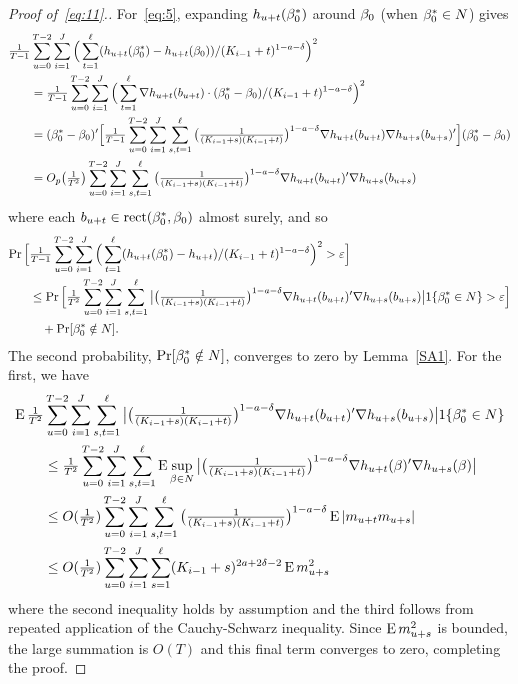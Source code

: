 \documentclass[12pt,fleqn]{article}
\begin{document}
\begin{proof}[Proof of~\eqref{eq:11}.]
For~\eqref{eq:5}, expanding $h_{u+t}(\beta_0^*)$ around $\beta_0$ (when
$\beta_0^* \in N$) gives
\begin{align*}
  \tfrac{1}{T-1} & \sum_{u = 0}^{T-2} \sum_{i=1}^J \Big(\sum_{t = 1}^{\ell} (h_{u + t}(\beta_0^*) - h_{u + t}(\beta_0))/ (K_{i-1} + t)^{1-a-\delta} \Big)^2 \\
  &= \tfrac{1}{T-1} \sum_{u = 0}^{T-2} \sum_{i=1}^J \Big(\sum_{t = 1}^{\ell}
  \nabla h_{u + t}(b_{u+t}) \cdot (\beta_0^* - \beta_0) / (K_{i-1} + t)^{1-a-\delta}\Big)^2 \\
  &= (\beta_0^* - \beta_0)' \Big[\tfrac{1}{T-1} \sum_{u = 0}^{T-2} \sum_{i=1}^J \sum_{s,t = 1}^{\ell}
  \big(\tfrac{1}{(K_{i-1} + s) (K_{i-1} + t)}\big)^{1-a-\delta} \nabla h_{u + t}(b_{u+t}) \nabla h_{u + s}(b_{u+s})' \Big] (\beta_0^* - \beta_0) \\
  &= O_p\big(\tfrac{1}{T^2}\big) \sum_{u = 0}^{T-2} \sum_{i=1}^J \sum_{s,t = 1}^{\ell}
  \big(\tfrac{1}{(K_{i-1} + s) (K_{i-1} + t)}\big)^{1-a-\delta} \nabla h_{u + t}(b_{u+t})' \nabla h_{u + s}(b_{u+s})
\end{align*}
where each $b_{u+t} \in \operatorname{rect}(\beta_0^*,\beta_0)$ almost surely, and so
\begin{align*}
  \operatorname{Pr}\Big[& \tfrac{1}{T-1} \sum_{u = 0}^{T-2} \sum_{i=1}^J
  \Big(\sum_{t = 1}^{\ell} (h_{u + t}(\beta_0^*) - h_{u + t})/ (K_{i-1} + t)^{1-a-\delta}\Big)^2 > \varepsilon \Big] \\
  & \leq \operatorname{Pr}\Big[ \tfrac{1}{T^2} \sum_{u = 0}^{T-2} \sum_{i=1}^J \sum_{s,t = 1}^{\ell}
  \big\lvert \big(\tfrac{1}{(K_{i-1} + s) (K_{i-1} + t)}\big)^{1-a-\delta}
  \nabla h_{u + t}(b_{u+t})' \nabla h_{u + s}(b_{u+s}) \big\rvert 1\{\beta_0^* \in N\} > \varepsilon \Big] \\
  &\quad + \operatorname{Pr}[\beta_0^* \notin N].
\end{align*}
The second probability, $\operatorname{Pr}[\beta_0^* \notin N]$, converges to zero by
Lemma~\ref{SA1}. For the first, we have
\begin{align*}
  \operatorname{E} \tfrac{1}{T^2} &\sum_{u = 0}^{T-2} \sum_{i=1}^J \sum_{s,t = 1}^{\ell}
  \big\lvert \big(\tfrac{1}{(K_{i-1} + s) (K_{i-1} + t)}\big)^{1-a-\delta}
  \nabla h_{u + t}(b_{u+t})' \nabla h_{u + s}(b_{u+s}) \big\rvert 1\{\beta_0^* \in N\} \\
  &\leq \tfrac{1}{T^2} \sum_{u = 0}^{T-2} \sum_{i=1}^J \sum_{s,t = 1}^{\ell}
  \operatorname{E} \sup_{\beta \in N} \big\lvert \big(\tfrac{1}{(K_{i-1} + s) (K_{i-1} + t)}\big)^{1-a-\delta}
  \nabla h_{u + t}(\beta)' \nabla h_{u + s}(\beta) \big\rvert \\
  &\leq O(\tfrac{1}{T^2}) \sum_{u = 0}^{T-2} \sum_{i=1}^J \sum_{s,t = 1}^{\ell}
  \big(\tfrac{1}{(K_{i-1} + s) (K_{i-1} + t)}\big)^{1-a-\delta} \operatorname{E} | m_{u+t} m_{u+s} | \\
  &\leq O(\tfrac{1}{T^2}) \sum_{u=0}^{T-2} \sum_{i=1}^J \sum_{s = 1}^{\ell} (K_{i-1} + s)^{2a + 2\delta - 2} \operatorname{E} m_{u+s}^2
\end{align*}
where the second inequality holds by assumption and the third follows
from repeated application of the Cauchy-Schwarz inequality. Since $\operatorname{E}
m_{u+s}^2$ is bounded, the large summation is $O(T)$ and this final
term converges to zero, completing the proof.
\end{proof}
\end{document}
